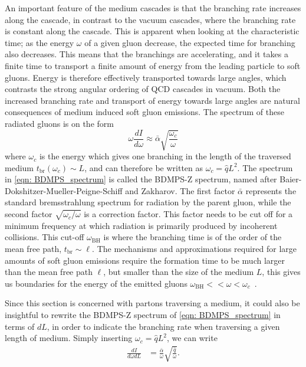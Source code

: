 \documentclass[main.tex]{subfiles}
\begin{document}
An important feature of the medium cascades is that the branching rate increases along the cascade, in contrast to the vacuum cascades, where the branching rate is constant along the cascade. This is apparent when looking at the characteristic time; as the energy \(\omega\) of a given gluon decrease, the expected time for branching also decreases. This means that the branchings are accelerating, and it takes a finite time to transport a finite amount of energy from the leading particle to soft gluons. Energy is therefore effectively transported towards large angles, which contrasts the strong angular ordering of QCD cascades in vacuum. Both the increased branching rate and transport of energy towards large angles are natural consequences of medium induced soft gluon emissions. The spectrum of these radiated gluons is on the form
\begin{equation}\label{eqn: BDMPS_spectrum}
    \omega \frac{dI}{d\omega} \approx \bar \alpha \sqrt{\frac{\omega_c}{\omega}}
\end{equation}
where \(\omega_c\) is the energy which gives one branching in the length of the traversed medium \(t_{\text{br}}(\omega_c) \sim L\), and can therefore be written as \(\omega_c = \hat q L^2\). The spectrum in \autoref{eqn: BDMPS_spectrum} is called the BDMPS-Z spectrum, named after Baier-Dokshitzer-Mueller-Peigne-Schiff and Zakharov. The first factor \(\bar \alpha\) represents the standard bremsstrahlung spectrum for radiation by the parent gluon, while the second factor \(\sqrt{\omega_c/\omega}\) is a correction factor. This factor needs to be cut off for a minimum frequency at which radiation is primarily produced by incoherent collisions. This cut-off \(\omega_{\text{BH}}\) is where the branching time is of the order of the mean free path, \(t_{\text{br}} \sim \ell\). The mechanisms and approximations required for large amounts of soft gluon emissions require the formation time to be much larger than the mean free path \(\ell\), but smaller than the size of the medium \(L\), this gives us boundaries for the energy of the emitted gluons \(\omega_{\text{BH}} << \omega < \omega_c\)~\cite{medium_induced_gluon_branching}.

Since this section is concerned with partons traversing a medium, it could also be insightful to rewrite the BDMPS-Z spectrum of \autoref{eqn: BDMPS_spectrum} in terms of \(dL\), in order to indicate the branching rate when traversing a given length of medium. Simply inserting \(\omega_c = \hat{q}L^2\), we can write
\begin{align}\label{eqn: BDMPS_branching_rate}
    \frac{dI}{d\omega dL} &= \frac{\bar \alpha}{\omega} \sqrt{\frac{\hat{q}}{\omega}}.
\end{align}
\end{document}
